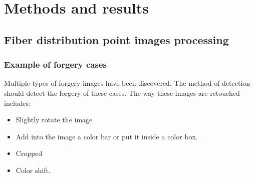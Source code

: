 \chapter{Methods and results}
\label{chap:problemsolving}

\startcontents[chapters]
\printmyminitoc{
}

\section{Fiber distribution point images processing}

\subsection{Example of forgery cases}

Multiple types of forgery images have been discovered. The method of detection should detect the forgery of these cases. The way these images are retouched includes:

\begin{itemize}
    \item Slightly rotate the image
    \item Add into the image a color bar or put it inside a color box.
    \item Cropped
    \item Color shift.
\end{itemize}


